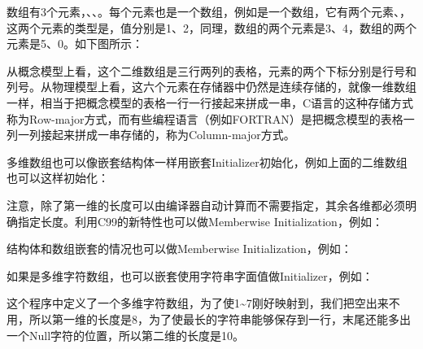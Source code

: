 数组有3个元素，、、。每个元素也是一个数组，例如是一个数组，它有两个元素、，这两个元素的类型是，值分别是1、2，同理，数组的两个元素是3、4，数组的两个元素是5、0。如下图所示：




从概念模型上看，这个二维数组是三行两列的表格，元素的两个下标分别是行号和列号。从物理模型上看，这六个元素在存储器中仍然是连续存储的，就像一维数组一样，相当于把概念模型的表格一行一行接起来拼成一串，C语言的这种存储方式称为Row-major方式，而有些编程语言（例如FORTRAN）是把概念模型的表格一列一列接起来拼成一串存储的，称为Column-major方式。



多维数组也可以像嵌套结构体一样用嵌套Initializer初始化，例如上面的二维数组也可以这样初始化：




注意，除了第一维的长度可以由编译器自动计算而不需要指定，其余各维都必须明确指定长度。利用C99的新特性也可以做Memberwise Initialization，例如：




结构体和数组嵌套的情况也可以做Memberwise Initialization，例如：




如果是多维字符数组，也可以嵌套使用字符串字面值做Initializer，例如：






这个程序中定义了一个多维字符数组，为了使1\textasciitilde{}\BookSplit{}7刚好映射到，我们把空出来不用，所以第一维的长度是8，为了使最长的字符串能够保存到一行，末尾还能多出一个Null字符的位置，所以第二维的长度是10。




